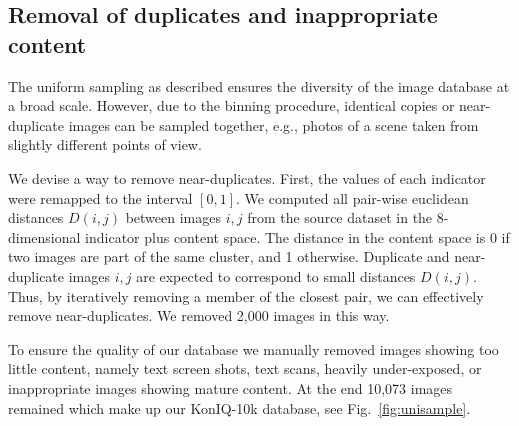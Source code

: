 \documentclass{article}
\begin{document}
\subsection{Removal of duplicates and inappropriate content}

The uniform sampling as described ensures the diversity of the image database at a broad scale. However, due to the binning procedure, identical copies or near-duplicate images can be sampled together, e.g.,  photos of a scene taken from slightly different points of view.

We devise a way to remove near-duplicates. First, the values of each indicator were remapped to the interval $[0,1]$. We computed all pair-wise euclidean distances $D(i,j)$ between images $i,j$ from the source dataset in the 8-dimensional indicator plus content space. The distance in the content space is 0 if two images are part of the same cluster, and 1 otherwise. Duplicate and near-duplicate images $i,j$ are expected to correspond to small distances $D(i,j)$. Thus, by iteratively removing a member of the closest pair, we can effectively remove near-duplicates. We removed 2,000 images in this way. 






To ensure the quality of our database we manually removed images showing too little content, namely text screen shots, text scans, heavily under-exposed, or inappropriate images showing mature content. At the end 10,073 images remained which make up our KonIQ-10k database, see Fig.~\ref{fig:unisample}.
\end{document}
